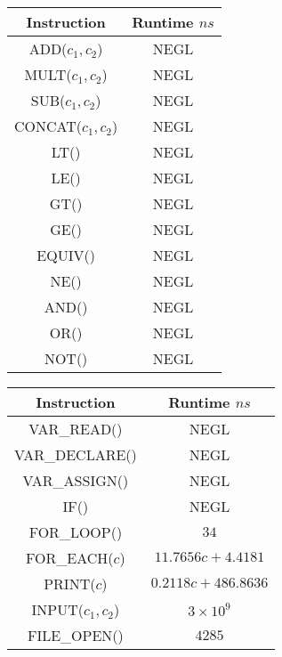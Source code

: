 \begin{figure}[!h]
  \begin{tabular}{cc}
    \hline
    Instruction          & Runtime \( ns \) \\
    \hline
    ADD(\(c_1, c_2\))    & NEGL             \\
    MULT(\(c_1, c_2\))   & NEGL             \\
    SUB(\(c_1, c_2\))    & NEGL             \\
    CONCAT(\(c_1, c_2\)) & NEGL             \\
    LT()                 & NEGL             \\
    LE()                 & NEGL             \\
    GT()                 & NEGL             \\
    GE()                 & NEGL             \\
    EQUIV()              & NEGL             \\
    NE()                 & NEGL             \\
    AND()                & NEGL             \\
    OR()                 & NEGL             \\
    NOT()                & NEGL             \\
  \end{tabular}
  \quad
  \hspace*{0.4cm}\begin{tabular}{cc}
    \hline
    Instruction                          & Runtime \( ns \)             \\
    \hline
    VAR\_READ()                          & NEGL                         \\
    VAR\_DECLARE()                       & NEGL                         \\
    VAR\_ASSIGN()                        & NEGL                         \\
    IF()                                 & NEGL                         \\
    FOR\_LOOP()                          & \( 34 \)                     \\
    FOR\_EACH(\( c \))                   & \( 11.7656c +  4.4181 \)     \\
    PRINT(\( c \))                       & \( 0.2118c + 486.8636\)      \\
    INPUT(\( c_1, c_2 \))\footnotemark{} & \( 3{\times}10^9\)           \\
    FILE\_OPEN()                         & \( 4285 \)                   \\

\end{tabular}
\end{figure}
